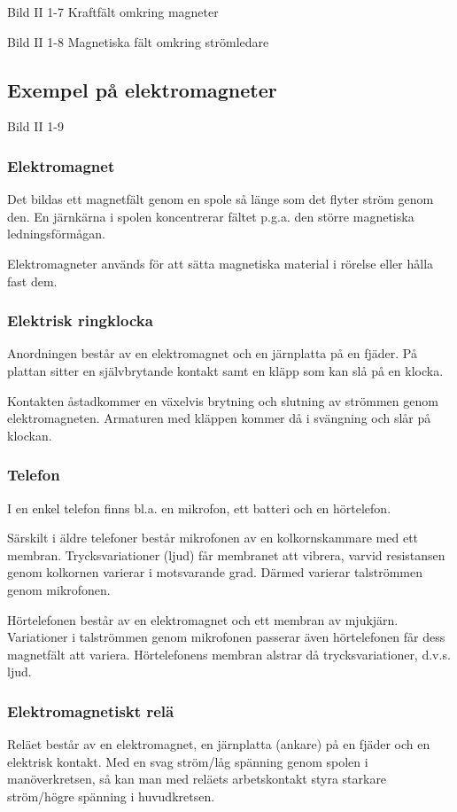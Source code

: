 Bild II 1-7 Kraftfält omkring magneter

Bild II 1-8 Magnetiska fält omkring strömledare

\subsection{Exempel på elektromagneter}

Bild II 1-9

\subsubsection{Elektromagnet}
Det bildas ett magnetfält genom en spole så länge som det flyter ström genom den. En
järnkärna i spolen koncentrerar fältet p.g.a. den större magnetiska ledningsförmågan.

Elektromagneter används för att sätta magnetiska material i rörelse eller hålla fast
dem.

\subsubsection{Elektrisk ringklocka}
Anordningen består av en elektromagnet och en järnplatta på en fjäder. På plattan
sitter en självbrytande kontakt samt en kläpp som kan slå på en klocka.

Kontakten åstadkommer en växelvis brytning och slutning av strömmen genom
elektromagneten. Armaturen med kläppen kommer då i svängning och slår på klockan.

\subsubsection{Telefon}
I en enkel telefon finns bl.a. en mikrofon, ett batteri och en hörtelefon.

Särskilt i äldre telefoner består mikrofonen av en kolkornskammare med ett membran.
Trycksvariationer (ljud) får membranet att vibrera, varvid resistansen genom kolkornen
varierar i motsvarande grad. Därmed varierar talströmmen genom mikrofonen.

Hörtelefonen består av en elektromagnet och ett membran av mjukjärn. Variationer i
talströmmen genom mikrofonen passerar även hörtelefonen får dess magnetfält att variera.
Hörtelefonens membran alstrar då trycksvariationer, d.v.s. ljud.

\subsubsection{Elektromagnetiskt relä}
Reläet består av en elektromagnet, en järnplatta (ankare) på en fjäder och en elektrisk
kontakt. Med en svag ström/låg spänning genom spolen i manöverkretsen, så kan
man med reläets arbetskontakt styra starkare ström/högre spänning i huvudkretsen.

